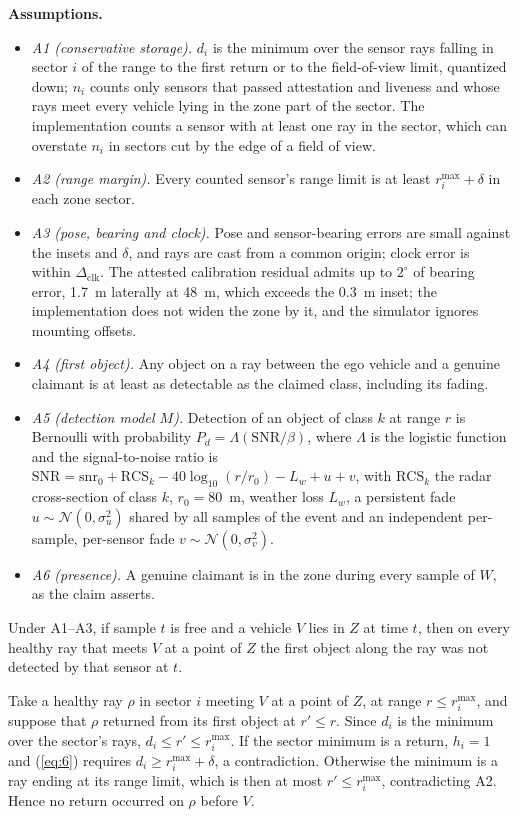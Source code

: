 \textbf{Assumptions.}
\begin{itemize}
\item \emph{A1 (conservative storage).} $d_i$ is the minimum over the sensor rays falling in sector $i$ of the range to the first return or to the field-of-view limit, quantized down; $n_i$ counts only sensors that passed attestation and liveness and whose rays meet every vehicle lying in the zone part of the sector. The implementation counts a sensor with at least one ray in the sector, which can overstate $n_i$ in sectors cut by the edge of a field of view.
\item \emph{A2 (range margin).} Every counted sensor's range limit is at least $r_i^{\max} + \delta$ in each zone sector.
\item \emph{A3 (pose, bearing and clock).} Pose and sensor-bearing errors are small against the insets and $\delta$, and rays are cast from a common origin; clock error is within $\Delta_{\mathrm{clk}}$. The attested calibration residual admits up to $2^\circ$ of bearing error, 1.7~m laterally at 48~m, which exceeds the 0.3~m inset; the implementation does not widen the zone by it, and the simulator ignores mounting offsets.
\item \emph{A4 (first object).} Any object on a ray between the ego vehicle and a genuine claimant is at least as detectable as the claimed class, including its fading.
\item \emph{A5 (detection model $M$).} Detection of an object of class $k$ at range $r$ is Bernoulli with probability $P_d = \Lambda(\mathrm{SNR}/\beta)$, where $\Lambda$ is the logistic function and the signal-to-noise ratio is $\mathrm{SNR} = \mathrm{snr}_0 + \mathrm{RCS}_k - 40\log_{10}(r/r_0) - L_w + u + v$, with $\mathrm{RCS}_k$ the radar cross-section of class $k$, $r_0 = 80$~m, weather loss $L_w$, a persistent fade $u \sim \mathcal{N}(0,\sigma_u^2)$ shared by all samples of the event and an independent per-sample, per-sensor fade $v \sim \mathcal{N}(0,\sigma_v^2)$.
\item \emph{A6 (presence).} A genuine claimant is in the zone during every sample of $W$, as the claim asserts.
\end{itemize}

\begin{proposition}\label{prop:1}
Under A1--A3, if sample $t$ is free and a vehicle $V$ lies in $Z$ at time $t$, then on every healthy ray that meets $V$ at a point of $Z$ the first object along the ray was not detected by that sensor at $t$.
\end{proposition}
\begin{IEEEproof}
Take a healthy ray $\rho$ in sector $i$ meeting $V$ at a point of $Z$, at range $r \le r_i^{\max}$, and suppose that $\rho$ returned from its first object at $r' \le r$. Since $d_i$ is the minimum over the sector's rays, $d_i \le r' \le r_i^{\max}$. If the sector minimum is a return, $h_i = 1$ and (\ref{eq:6}) requires $d_i \ge r_i^{\max} + \delta$, a contradiction. Otherwise the minimum is a ray ending at its range limit, which is then at most $r' \le r_i^{\max}$, contradicting A2. Hence no return occurred on $\rho$ before $V$.
\end{IEEEproof}

